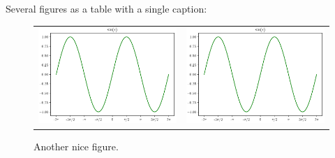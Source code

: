 \documentclass[11pt,a4paper,english,twoside,notitlepage,openright]{article}
\begin{document}
Several figures as a table with a single caption:
\begin{figure}[!h]
  \centering
  \begin{tabular}{cc}
    \includegraphics[scale=0.2]{figures/sin.png}
    &
    \includegraphics[scale=0.2]{figures/sin.png}
  \end{tabular}
  \caption{Another nice figure.}\label{fig:lab}
\end{figure}
\end{document}

